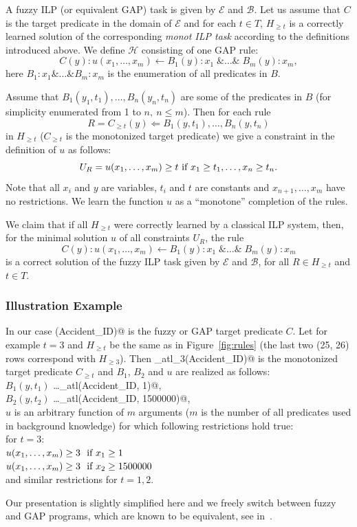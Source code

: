 \begin{theorem}
A fuzzy ILP (or equivalent GAP) task is given by ${\mathcal E}$ and ${\mathcal B}$. Let us assume that $C$ is the target predicate in the domain of ${\mathcal E}$ and for each $t \in T$, $H_{\ge t}$ is a correctly learned solution of the corresponding \textit{monot ILP task} according to the definitions introduced above. We define ${\mathcal H}$ consisting of one GAP rule:
$$C(y):u(x_1,\dots,x_m)\leftarrow B_1(y):x_1\; \&\dots\& \;B_m(y):x_m,$$
here $B_1:x_1 \&\dots\& B_m:x_m$ is the enumeration of all predicates in $B$.

Assume that $B_1(y_1,t_1),\dots,B_n(y_n,t_n)$ are some of the predicates in $B$ (for simplicity enumerated from 1 to $n, \ n \le m$). Then for each rule 
$$
R=C_{\ge t}(y)\Leftarrow B_1(y,t_1),\dots,B_n(y,t_n)
$$
in $H_{\ge t}$ ($C_{\ge t}$ is the monotonized target predicate) we give a constraint in the definition of $u$ as follows:
$$
U_R=u(x_1,\dots,x_m)\ge t \hbox{ if }x_1\ge t_1,\dots,x_n\ge t_n.
$$
Note that all $x_i$ and $y$ are variables, $t_i$ and $t$ are constants and $x_{n+1},\dots,x_m$ have no restrictions.
We learn the function $u$ as a ``monotone'' completion of the rules. 

We claim that if all $H_{\ge t}$ were correctly learned by a classical ILP system, then, for the minimal solution $u$ of all constraints $U_R$, the rule
$$
C(y):u(x_1,\dots,x_m)\leftarrow B_1(y):x_1\; \&\dots\& \;B_m(y):x_m
$$
is a correct solution of the fuzzy ILP task given by ${\mathcal E}$ and ${\mathcal B}$, for all $R\in H_{\ge t}$ and $t\in T$. 
\end{theorem}



\subsubsection{Illustration Example}

In our case \verb@serious(Accident_ID)@ is the fuzzy or GAP target predicate $C$. Let for example $t=3$ and $H_{\ge t}$ be the same as in Figure~\ref{fig:rules} (the last two (25, 26) rows correspond with $H_{\ge 3}$). Then \verb@serious_atl_3(Accident_ID)@ is the monotonized target predicate $C_{\ge t}$ and $B_1$, $B_2$ and $u$ are realized as follows:\\
\hspace*{1cm}$B_1(y,t_1)$ \dots \verb@fatalities_atl(Accident_ID, 1)@,\\
\hspace*{1cm}$B_2(y,t_2)$ \dots \verb@damage_atl(Accident_ID, 1500000)@,\\
$u$ is an arbitrary function of $m$ arguments ($m$ is the number of all predicates used in background knowledge) for which following restrictions hold true:\\
for $t=3$:\\
\hspace*{1cm}$u(x_1,\dots,x_m) \ge 3 \ \hbox{ if }x_1\ge 1$\\
\hspace*{1cm}$u(x_1,\dots,x_m) \ge 3 \ \hbox{ if }x_2\ge 1500000$\\
and similar restrictions for $t=1,2$.


\bigskip
Our presentation is slightly simplified here and we freely switch between fuzzy and GAP programs, which are known to be equivalent, see in~\citep{biblio:KLV}.




